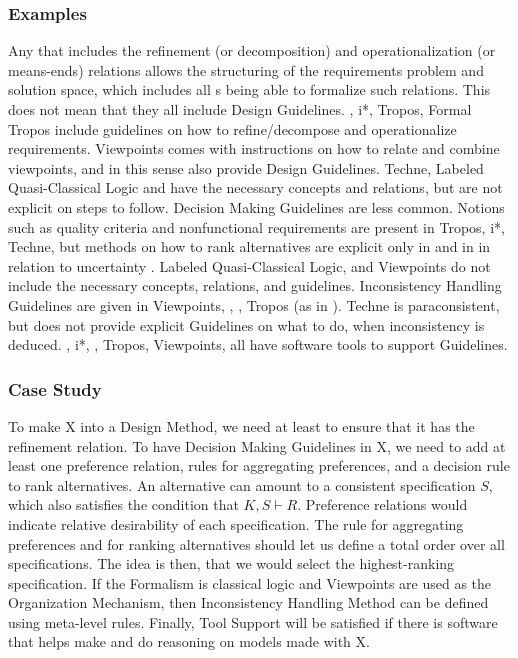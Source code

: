 \documentclass[10pt, final, conference, compsocconf]{IEEEtran}
\begin{document}
\subsubsection{Examples}
Any  that includes the refinement (or decomposition) and operationalization (or means-ends) relations allows the structuring of the requirements problem and solution space, which includes all s being able to formalize such relations. This does not mean that they all include Design Guidelines. , i*, Tropos, Formal Tropos include guidelines on how to refine/decompose and operationalize requirements. Viewpoints comes with instructions on how to relate and combine viewpoints, and in this sense also provide Design Guidelines. Techne, Labeled Quasi-Classical Logic and  have the necessary concepts and relations, but are not explicit on steps to follow. Decision Making Guidelines are less common. Notions such as quality criteria and nonfunctional requirements are present in Tropos, i*, Techne, but methods on how to rank alternatives are explicit only in  and in  in relation to uncertainty \cite{Letier+:2004:FSE}. Labeled Quasi-Classical Logic,  and Viewpoints do not include the necessary concepts, relations, and guidelines. Inconsistency Handling Guidelines are given in Viewpoints, , , Tropos (as in ). Techne is paraconsistent, but does not provide explicit Guidelines on what to do, when inconsistency is deduced. , i*, , Tropos, Viewpoints,  all have software tools to support Guidelines. 

\subsubsection{Case Study}
To make X into a Design Method, we need at least to ensure that it has the refinement relation. To have Decision Making Guidelines in X, we need to add at least one preference relation, rules for aggregating preferences, and a decision rule to rank alternatives. An alternative can amount to a consistent specification $S$, which also satisfies the condition that $K, S \vdash R$. Preference relations would indicate relative desirability of each specification. The rule for aggregating preferences and for ranking alternatives should let us define a total order over all specifications. The idea is then, that we would select the highest-ranking specification. If the Formalism is classical logic and Viewpoints are used as the Organization Mechanism, then Inconsistency Handling Method can be defined using meta-level rules. Finally, Tool Support will be satisfied if there is software that helps make and do reasoning on models made with X.
\end{document}
